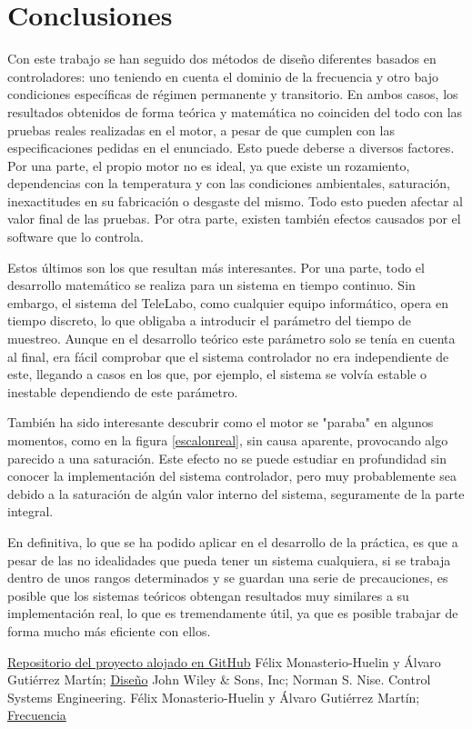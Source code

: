 \documentclass[a4paper]{article}
\begin{document}
\section{Conclusiones}

Con este trabajo se han seguido dos métodos de diseño diferentes basados en controladores: uno teniendo en cuenta el dominio de la frecuencia y otro bajo condiciones específicas de régimen permanente y transitorio.
En ambos casos, los resultados obtenidos de forma teórica y matemática no coinciden del todo con las pruebas reales realizadas en el motor, a pesar de que cumplen con las especificaciones pedidas en el enunciado.
Esto puede deberse a diversos factores. Por una parte, el propio motor no es ideal, ya que existe un rozamiento, dependencias con la temperatura y con las condiciones ambientales, saturación, inexactitudes en su fabricación o desgaste del mismo. Todo esto pueden afectar al valor final de las pruebas.
Por otra parte, existen también efectos causados por el software que lo controla.

Estos últimos son los que resultan más interesantes. Por una parte, todo el desarrollo matemático se realiza para un sistema en tiempo continuo. Sin embargo, el sistema del TeleLabo, como cualquier equipo informático, opera en tiempo discreto, lo que obligaba a introducir el parámetro del tiempo de muestreo.
Aunque en el desarrollo teórico este parámetro solo se tenía en cuenta al final, era fácil comprobar que el sistema controlador no era independiente de este, llegando a casos en los que, por ejemplo, el sistema se volvía estable o inestable dependiendo de este parámetro.

También ha sido interesante descubrir como el motor se "paraba" en algunos momentos, como en la figura \ref{escalonreal}, sin causa aparente, provocando algo parecido a una saturación. Este efecto no se puede estudiar en profundidad sin conocer la implementación del sistema controlador, pero muy probablemente sea debido a la saturación de algún valor interno del sistema, seguramente de la parte integral.

En definitiva, lo que se ha podido aplicar en el desarrollo de la práctica, es que a pesar de las no idealidades que pueda tener un sistema cualquiera, si se trabaja dentro de unos rangos determinados y se guardan una serie de precauciones, es posible que los sistemas teóricos obtengan resultados muy similares a su implementación real, lo que es tremendamente útil, ya que es posible trabajar de forma mucho más eficiente con ellos.


\begin{thebibliography}{9}
 \href{https://github.com/avicarioe/telelabo}{Repositorio del proyecto alojado en GitHub}
 Félix Monasterio-Huelin y Álvaro Gutiérrez Martín;
\href{http://www.robolabo.etsit.upm.es/asignaturas/seco/apuntes/design.pdf}{Diseño}
 John Wiley \& Sons, Inc; Norman S. Nise. Control Systems Engineering.
 Félix Monasterio-Huelin y Álvaro Gutiérrez Martín;
\href{http://robolabo.etsit.upm.es/asignaturas/seco/apuntes/frecuencia.pdf} {Frecuencia}


\end{thebibliography}
\end{document}
